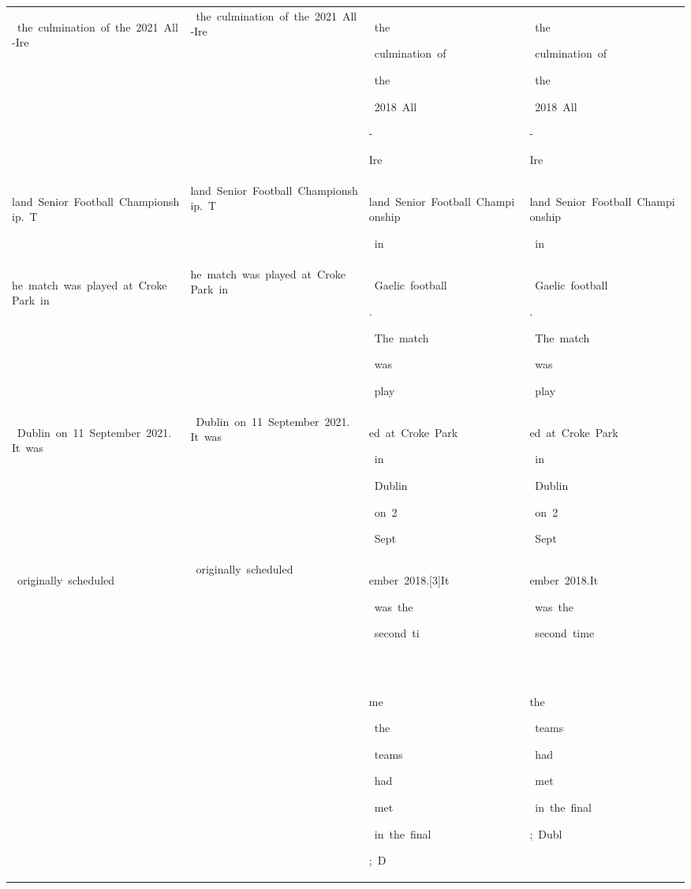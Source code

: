 \begin{table}[h]
\begin{tabular}{ l l l l }
 \colorbox{cm_32!40}{\strut \ the\ culmination\ of\ the\ 2021\ All-Ire} & \ the\ culmination\ of\ the\ 2021\ All-Ire & \colorbox{cm_12!40}{\strut \ the}\colorbox{cm_0!40}{\strut \ culmination\ of}\colorbox{cm_12!40}{\strut \ the}\colorbox{cm_0!40}{\strut \ 2018\ All}\colorbox{cm_12!40}{\strut -}\colorbox{cm_0!40}{\strut Ire} & \colorbox{cm_12!40}{\strut \ the}\colorbox{cm_0!40}{\strut \ culmination\ of}\colorbox{cm_12!40}{\strut \ the}\colorbox{cm_0!40}{\strut \ 2018\ All}\colorbox{cm_12!40}{\strut -}\colorbox{cm_0!40}{\strut Ire} \\ 
 \colorbox{cm_32!40}{\strut land\ Senior\ Football\ Championship.\ T} & land\ Senior\ Football\ Championship.\ T & \colorbox{cm_0!40}{\strut land\ Senior\ Football\ Championship}\colorbox{cm_12!40}{\strut \ in} & \colorbox{cm_0!40}{\strut land\ Senior\ Football\ Championship}\colorbox{cm_12!40}{\strut \ in} \\ 
 \colorbox{cm_32!40}{\strut he\ match\ was\ played\ at\ Croke\ Park\ in} & he\ match\ was\ played\ at\ Croke\ Park\ in & \colorbox{cm_0!40}{\strut \ Gaelic\ football}\colorbox{cm_12!40}{\strut .}\colorbox{cm_0!40}{\strut \ The\ match}\colorbox{cm_12!40}{\strut \ was}\colorbox{cm_0!40}{\strut \ play} & \colorbox{cm_0!40}{\strut \ Gaelic\ football}\colorbox{cm_12!40}{\strut .}\colorbox{cm_0!40}{\strut \ The\ match}\colorbox{cm_12!40}{\strut \ was}\colorbox{cm_0!40}{\strut \ play} \\ 
 \colorbox{cm_32!40}{\strut \ Dublin\ on\ 11\ September\ 2021.\ It\ was} & \ Dublin\ on\ 11\ September\ 2021.\ It\ was & \colorbox{cm_0!40}{\strut ed\ at\ Croke\ Park}\colorbox{cm_12!40}{\strut \ in}\colorbox{cm_0!40}{\strut \ Dublin}\colorbox{cm_12!40}{\strut \ on\ 2}\colorbox{cm_0!40}{\strut \ Sept} & \colorbox{cm_0!40}{\strut ed\ at\ Croke\ Park}\colorbox{cm_12!40}{\strut \ in}\colorbox{cm_0!40}{\strut \ Dublin}\colorbox{cm_12!40}{\strut \ on\ 2}\colorbox{cm_0!40}{\strut \ Sept} \\ 
 \colorbox{cm_32!40}{\strut \ originally\ scheduled} & \ originally\ scheduled & \colorbox{cm_0!40}{\strut ember\ 2018.[3]It}\colorbox{cm_12!40}{\strut \ was\ the}\colorbox{cm_0!40}{\strut \ second\ ti} & \colorbox{cm_0!40}{\strut ember\ 2018.It}\colorbox{cm_12!40}{\strut \ was\ the}\colorbox{cm_0!40}{\strut \ second\ time}\colorbox{cm_12!40}{\strut \ } \\ 
  &  & \colorbox{cm_0!40}{\strut me}\colorbox{cm_12!40}{\strut \ the}\colorbox{cm_0!40}{\strut \ teams}\colorbox{cm_12!40}{\strut \ had}\colorbox{cm_0!40}{\strut \ met}\colorbox{cm_12!40}{\strut \ in\ the\ final}\colorbox{cm_0!40}{\strut ;\ D} & \colorbox{cm_12!40}{\strut the}\colorbox{cm_0!40}{\strut \ teams}\colorbox{cm_12!40}{\strut \ had}\colorbox{cm_0!40}{\strut \ met}\colorbox{cm_12!40}{\strut \ in\ the\ final}\colorbox{cm_0!40}{\strut ;\ Dubl} \\ 

\end{tabular}
\end{table}
